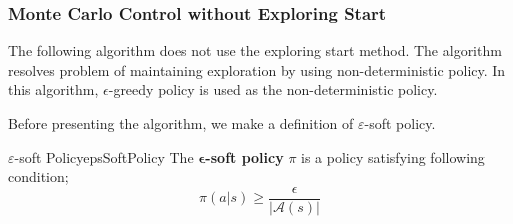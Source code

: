 \documentclass[../../main.tex]{subfiles}
\begin{document}
        \subsubsection{Monte Carlo Control without Exploring Start}
            The following algorithm does not use the exploring start method. The algorithm resolves problem of maintaining exploration by using non-deterministic policy.
            In this algorithm, $\epsilon$-greedy policy is used as the non-deterministic policy.

            Before presenting the algorithm, we make a definition of $\varepsilon$-soft policy.
            \begin{defn}{$\varepsilon$-soft Policy}{epsSoftPolicy}
                The $\bm{\epsilon}$\textbf{-soft policy} $\pi$ is a policy satisfying following condition;
                \[
                    \pi(a|s) \geq \frac{\epsilon}{|\mathcal{A}(s)|}
                \]
            \end{defn}
\end{document}
